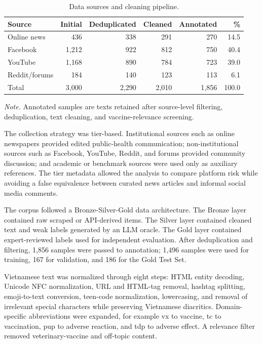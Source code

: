 \documentclass[runningheads]{llncs}
\begin{document}
\begin{table}[t]
\caption{Data sources and cleaning pipeline.}\label{tab:sources}
\centering
\small
\setlength{\tabcolsep}{4pt}
\renewcommand{\arraystretch}{1.05}
\begin{tabular}{lrrrrr}
\hline
Source & Initial & Deduplicated & Cleaned & Annotated & \%\\
\hline
Online news & 436 & 338 & 291 & 270 & 14.5\\
Facebook & 1,212 & 922 & 812 & 750 & 40.4\\
YouTube & 1,168 & 890 & 784 & 723 & 39.0\\
Reddit/forums & 184 & 140 & 123 & 113 & 6.1\\
Total & 3,000 & 2,290 & 2,010 & 1,856 & 100.0\\
\hline
\end{tabular}
\vspace{2pt}
\parbox{\textwidth}{\footnotesize\emph{Note.} Annotated samples are texts retained after source-level filtering, deduplication, text cleaning, and vaccine-relevance screening.}
\end{table}

The collection strategy was tier-based. Institutional sources such as online newspapers provided edited public-health communication; non-institutional sources such as Facebook, YouTube, Reddit, and forums provided community discussion; and academic or benchmark sources were used only as auxiliary references. The tier metadata allowed the analysis to compare platform risk while avoiding a false equivalence between curated news articles and informal social media comments.

The corpus followed a Bronze-Silver-Gold data architecture. The Bronze layer contained raw scraped or API-derived items. The Silver layer contained cleaned text and weak labels generated by an LLM oracle. The Gold layer contained expert-reviewed labels used for independent evaluation. After deduplication and filtering, 1,856 samples were passed to annotation; 1,496 samples were used for training, 167 for validation, and 186 for the Gold Test Set.

Vietnamese text was normalized through eight steps: HTML entity decoding, Unicode NFC normalization, URL and HTML-tag removal, hashtag splitting, emoji-to-text conversion, teen-code normalization, lowercasing, and removal of irrelevant special characters while preserving Vietnamese diacritics. Domain-specific abbreviations were expanded, for example vx to vaccine, tc to vaccination, pup to adverse reaction, and tdp to adverse effect. A relevance filter removed veterinary-vaccine and off-topic content.
\end{document}

